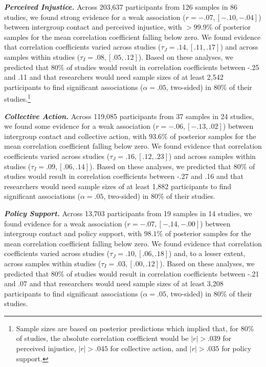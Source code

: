 \documentclass[12pt, letterpaper]{article}
\begin{document}
\textbf{\emph{Perceived Injustice.}} Across 203,637 participants from
126 samples in 86 studies, we found strong evidence for a weak
association (\(r = -.07, [-.10, -.04]\)) between intergroup contact and
perceived injustice, with \(>99.9\%\) of posterior samples for the mean
correlation coefficient falling below zero. We found evidence that
correlation coefficients varied across studies
(\(\tau_J = .14, [.11, .17]\)) and across samples within studies
(\(\tau_I = .08, [.05, .12]\)). Based on these analyses, we predicted
that 80\% of studies would result in correlation coefficients between
-.25 and .11 and that researchers would need sample sizes of at least
2,542 participants to find significant associations (\(\alpha = .05\),
two-sided) in 80\% of their studies.\footnote{Sample sizes are based on
  posterior predictions which implied that, for 80\% of studies, the
  absolute correlation coefficient would be \(|r| > .039\) for perceived
  injustice, \(|r| > .045\) for collective action, and \(|r| > .035\)
  for policy support.}

\textbf{\emph{Collective Action.}} Across 119,085 participants from 37
samples in 24 studies, we found some evidence for a weak association
(\(r = -.06, [-.13, .02]\)) between intergroup contact and collective
action, with \(93.6\%\) of posterior samples for the mean correlation
coefficient falling below zero. We found evidence that correlation
coefficients varied across studies (\(\tau_J = .16, [.12, .23]\)) and
across samples within studies (\(\tau_I = .09, [.06, .14]\)). Based on
these analyses, we predicted that 80\% of studies would result in
correlation coefficients between -.27 and .16 and that researchers would
need sample sizes of at least 1,882 participants to find significant
associations (\(\alpha = .05\), two-sided) in 80\% of their studies.

\textbf{\emph{Policy Support.}} Across 13,703 participants from 19
samples in 14 studies, we found evidence for a weak association
(\(r = -.07, [-.14, -.00]\)) between intergroup contact and policy
support, with \(98.1\%\) of posterior samples for the mean correlation
coefficient falling below zero. We found evidence that correlation
coefficients varied across studies (\(\tau_J = .10, [.06, .18]\)) and,
to a lesser extent, across samples within studies
(\(\tau_I = .03, [.00, .12]\)). Based on these analyses, we predicted
that 80\% of studies would result in correlation coefficients between
-.21 and .07 and that researchers would need sample sizes of at least
3,208 participants to find significant associations (\(\alpha = .05\),
two-sided) in 80\% of their studies.
\end{document}
